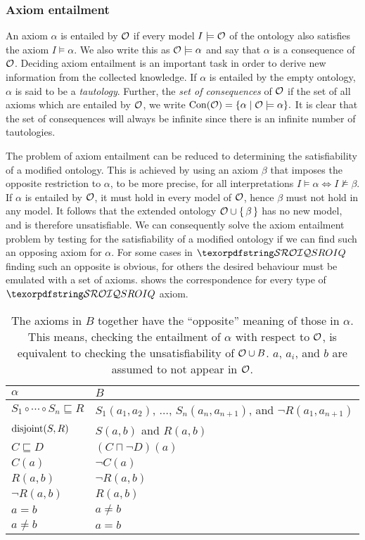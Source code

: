 \subsubsection{Axiom entailment} \label{axiom-entailment}

An axiom $\alpha$ is entailed by $\mathcal{O}$ if every model $I \models \mathcal{O}$ of the ontology also satisfies the axiom $I \models \alpha$. We also write this as $\mathcal{O} \models \alpha$ and say that $\alpha$ is a consequence of $\mathcal{O}$. Deciding axiom entailment is an important task in order to derive new information from the collected knowledge. If $\alpha$ is entailed by the empty ontology, $\alpha$ is said to be a \emph{tautology}. Further, the \emph{set of consequences} of $\mathcal{O}$ if the set of all axioms which are entailed by $\mathcal{O}$, we write $\operatorname{Con}(\mathcal{O}) = \{ \alpha \mid \mathcal{O} \models \alpha \}.$ It is clear that the set of consequences will always be infinite since there is an infinite number of tautologies.

The problem of axiom entailment can be reduced to determining the satisfiability of a modified ontology. This is achieved by using an axiom $\beta$ that imposes the opposite restriction to $\alpha$, to be more precise, for all interpretations $I \models \alpha \iff I \not\models \beta$. If $\alpha$ is entailed by $\mathcal{O}$, it must hold in every model of $\mathcal{O}$, hence $\beta$ must not hold in any model. It follows that the extended ontology $\mathcal{O} \cup \{ \, \beta \, \}$ has no new model, and is therefore unsatisfiable. We can consequently solve the axiom entailment problem by testing for the satisfiability of a modified ontology if we can find such an opposing axiom for $\alpha$. For some cases in $\SROIQ$ finding such an opposite is obvious, for others the desired behaviour must be emulated with a set of axioms.  shows the correspondence for every type of $\SROIQ$ axiom.
\begin{table}[ht]
  \centering
  \begin{tabular}{|l|l|}
    \hline
    $\alpha$ & $B$ \\
    \hline
    $S_1 \circ \cdots \circ S_n \sqsubseteq R$ & $S_1(a_1, a_2)$, $\dots$, $S_n(a_n, a_{n + 1})$, and $\lnot R(a_1, a_{n + 1})$ \\
    $\operatorname{disjoint}(S, R)$ & $S(a, b)$ and $R(a, b)$ \\
    $C \sqsubseteq D$ & $(C \sqcap \lnot D)(a)$ \\
    $C(a)$ & $\lnot C(a)$ \\
    $R(a, b)$ & $\lnot R(a, b)$ \\
    $\lnot R(a, b)$ & $R(a, b)$ \\
    $a = b$ & $a \not= b$ \\
    $a \not= b$ & $a = b$ \\
    \hline
  \end{tabular}
  \label{tab:entailment-reduction}
  \caption[Axioms substitution for reducing entailment to satisfiability]{The axioms in $B$ together have the “opposite” meaning of those in $\alpha$. This means, checking the entailment of $\alpha$ with respect to $\mathcal{O}$, is equivalent to checking the unsatisfiability of $\mathcal{O} \cup B$. $a$, $a_i$, and $b$ are assumed to not appear in $\mathcal{O}$.}
\end{table}


